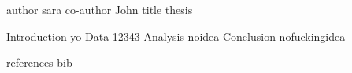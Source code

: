 author  sara
co-author John
title  thesis

Introduction  yo
Data  12343
Analysis  noidea
Conclusion nofuckingidea

references  bib 
